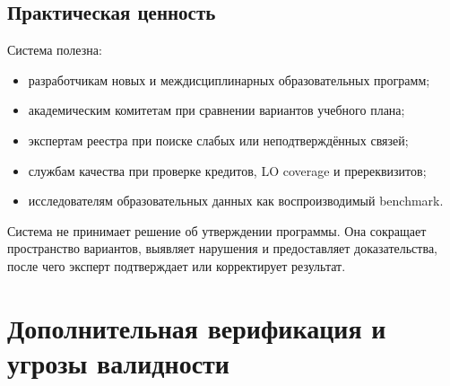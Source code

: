 \documentclass[twoside,11pt]{article}
\begin{document}
\subsection{Практическая ценность}

Система полезна:
\begin{itemize}
  \item разработчикам новых и междисциплинарных образовательных программ;
  \item академическим комитетам при сравнении вариантов учебного плана;
  \item экспертам реестра при поиске слабых или неподтверждённых связей;
  \item службам качества при проверке кредитов, LO coverage и пререквизитов;
  \item исследователям образовательных данных как воспроизводимый benchmark.
\end{itemize}

Система не принимает решение об утверждении программы. Она сокращает пространство вариантов, выявляет нарушения и предоставляет доказательства, после чего эксперт подтверждает или корректирует результат.

\section{Дополнительная верификация и угрозы валидности}
\end{document}
